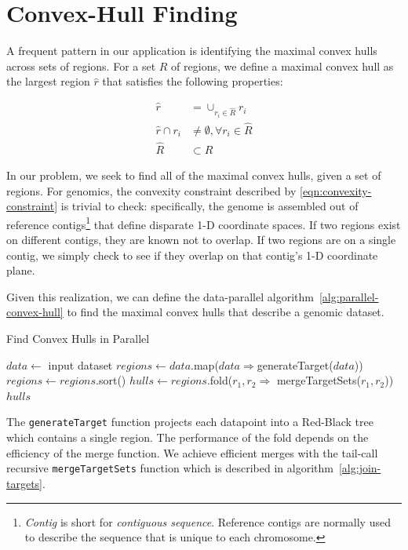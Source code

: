 \documentclass{acm_proc_article-sp}
\begin{document}
\section{Convex-Hull Finding}
\label{sec:convex-hull}

A frequent pattern in our application is identifying the maximal convex hulls across sets of regions. For
a set $R$ of regions, we define a maximal convex hull as the largest region $\hat{r}$ that satisfies the
following properties:

\begin{align}
\label{eqn:convexity-constraint}
\hat{r} &= \cup_{r_i \in \hat{R}} r_i \\
\hat{r} \cap r_i &\ne \emptyset, \forall r_i \in \hat{R} \\
\hat{R} &\subset R
\end{align}

In our problem, we seek to find all of the maximal convex hulls, given a set of regions. For genomics, the
convexity constraint described by \eqref{eqn:convexity-constraint} is trivial to check: specifically, the
genome is assembled out of reference contigs\footnote{\emph{Contig} is short for \emph{contiguous
sequence}. Reference contigs are normally used to describe the sequence that is unique to each
chromosome.} that define disparate 1-D coordinate spaces. If two regions exist on different contigs, they
are known not to overlap. If two regions are on a single contig, we simply check to see if they overlap
on that contig's 1-D coordinate plane.

Given this realization, we can define the data-parallel algorithm~\ref{alg:parallel-convex-hull} to find the
maximal convex hulls that describe a genomic dataset.

\begin{algorithm}
\caption{Find Convex Hulls in Parallel}
\label{alg:parallel-convex-hull}
\begin{algorithmic}
\STATE $data \leftarrow$ input dataset
\STATE $regions \leftarrow data$.map($data \Rightarrow $generateTarget($data$))
\STATE $regions \leftarrow regions$.sort()
\STATE $hulls \leftarrow regions$.fold($r_1, r_2 \Rightarrow$ mergeTargetSets($r_1, r_2$))
\RETURN $hulls$
\end{algorithmic}
\end{algorithm}

The \texttt{generateTarget} function projects each datapoint into a Red-Black tree which contains a
single region. The performance of the fold depends on the efficiency of the merge function. We achieve
efficient merges with the tail-call recursive \texttt{mergeTargetSets} function which is described in
algorithm~\ref{alg:join-targets}.
\end{document}
